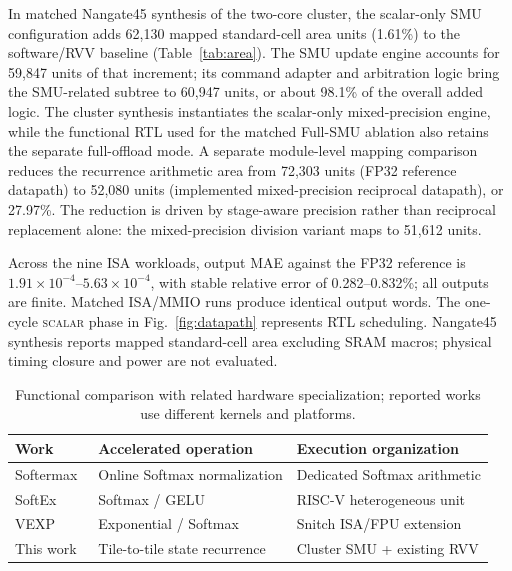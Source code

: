 \documentclass[journal]{IEEEtran}
\begin{document}
In matched Nangate45 synthesis of the two-core cluster, the scalar-only SMU
configuration adds 62,130 mapped standard-cell area units (1.61\%) to the
software/RVV baseline (Table~\ref{tab:area}). The SMU update engine
accounts for 59,847 units of that increment; its command adapter and
arbitration logic bring the SMU-related subtree to 60,947 units, or about
98.1\% of the overall added logic. The cluster synthesis instantiates the
scalar-only mixed-precision engine, while the functional RTL used for the
matched Full-SMU ablation also retains the separate full-offload mode. A separate module-level
mapping comparison reduces the recurrence arithmetic area from 72,303
units (FP32 reference datapath) to 52,080 units (implemented mixed-precision
reciprocal datapath), or 27.97\%. The reduction is driven by stage-aware
precision rather than reciprocal replacement alone: the mixed-precision
division variant maps to 51,612 units.

Across the nine ISA workloads, output MAE against the FP32 reference is
$1.91\times10^{-4}$--$5.63\times10^{-4}$, with stable relative error of
0.282--0.832\%; all outputs are finite. Matched ISA/MMIO runs produce
identical output words. The one-cycle \textsc{scalar} phase in
Fig.~\ref{fig:datapath} represents RTL scheduling. Nangate45 synthesis
reports mapped standard-cell area excluding SRAM macros; physical timing
closure and power are not evaluated.

\begin{table}[t]
\centering
\caption{Functional comparison with related hardware specialization;
reported works use different kernels and platforms.}
\label{tab:related}
\footnotesize
\setlength{\tabcolsep}{3pt}
\begin{tabular}{@{}>{\raggedright\arraybackslash}p{}>{\raggedright\arraybackslash}p{}>{\raggedright\arraybackslash}p{}@{}}
\toprule
Work & Accelerated operation & Execution organization\\
\midrule
Softermax~\cite{stevens2021softermax} & Online Softmax normalization & Dedicated Softmax arithmetic\\
SoftEx~\cite{belano2025softex} & Softmax / GELU & RISC-V heterogeneous unit\\
VEXP~\cite{wang2025vexp} & Exponential / Softmax & Snitch ISA/FPU extension\\
This work & Tile-to-tile state recurrence & Cluster SMU + existing RVV\\
\bottomrule
\end{tabular}
\end{table}
\end{document}
